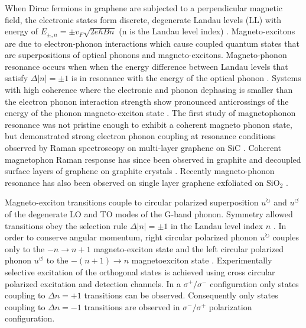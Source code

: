 \documentclass[prl,aps,superscriptaddress,showpacs,reprint]{revtex4-1}
\begin{document}
When Dirac fermions in graphene are subjected to a perpendicular magnetic field, the electronic states form discrete, degenerate Landau levels (LL) with energy of $E_{\pm, n}=\pm v_F\sqrt{2e\hbar Bn}$ (n is the Landau level index) \cite{neto2009electronic,goerbig2011electronic}. Magneto-excitons are due to electron-phonon interactions which cause  coupled quantum states that are superpositions of optical phonons and magneto-excitons. Magneto-phonon resonance occurs when when the energy difference between Landau levels that satisfy $\Delta\left|n\right|=\pm 1$   is in resonance with the energy of the optical phonon \cite{ando2007magnetic,goerbig2007filling,goerbig2011electronic}. Systems with high coherence where the electronic and phonon dephasing is smaller than the electron phonon interaction strength show pronounced anticrossings of the energy of the phonon magneto-exciton state \cite{ando2007magnetic,goerbig2007filling,goerbig2011electronic}. The first study  of magnetophonon resonance was not pristine enough to exhibit  a coherent magneto phonon state, but demonstrated strong electron phonon coupling at resonance conditions observed by Raman spectroscopy on multi-layer graphene on SiC \cite{faugeras2009tuning} . Coherent magnetophon Raman response has since been observed in graphite \cite{PhysRevB.84.235138,kim2012magnetophonon,PhysRevLett.110.227402,PhysRevB.80.241404,yan2010observation} and decoupled surface layers of graphene on graphite crystals \cite{kuhne2012polarization,faugeras2011magneto,yan2010observation}. Recently magneto-phonon resonance has also been observed on single layer graphene exfoliated on SiO$_2$ \cite{PhysRevLett.110.227402}.  

Magneto-exciton transitions couple to circular polarized superposition $u^{\circlearrowright}$ and $u^{\circlearrowleft}$ of the degenerate LO and TO modes of the G-band phonon. Symmetry allowed transitions obey the selection rule $\Delta\left|n\right|=\pm 1$ in the Landau level index $n$ \cite{PhysRevB.84.235138}. In order to conserve angular momentum, right circular polarized phonon $u^{\circlearrowright}$ couples only to the $-n\rightarrow n+1$ magneto-exciton state and the left circular polarized phonon $u^{\circlearrowleft}$ to the $-(n+1)\rightarrow n$ magnetoexciton state \cite{goerbig2007filling}. Experimentally selective excitation of the orthogonal states is achieved using cross circular polarized excitation and detection channels\cite{PhysRevLett.110.227402,kossacki2012circular}. In a $\sigma^+/\sigma^-$ configuration only states coupling to $\Delta n=+1$ transitions can be observed. Consequently only states coupling to $\Delta n=-1$ transitions are observed in $\sigma^-/\sigma^+$ polarization configuration.
\end{document}
